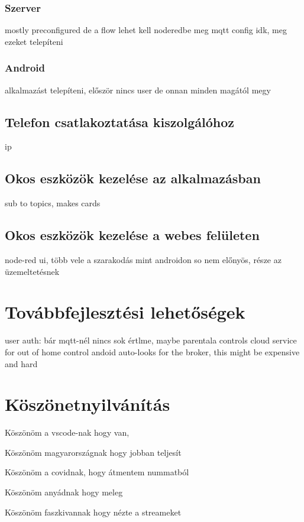 \documentclass[
]{thesis-ekf}
\theoremstyle{definition}
\theoremstyle{remark}
\begin{document}
\subsection{Szerver}
mostly preconfigured de a flow lehet kell noderedbe meg mqtt config idk, meg ezeket telepíteni
\subsection{Android}
alkalmazást telepíteni, először nincs user de onnan minden magától megy
\section{Telefon csatlakoztatása kiszolgálóhoz}
ip
\section{Okos eszközök kezelése az alkalmazásban}
sub to topics, makes cards
\section{Okos eszközök kezelése a webes felületen}
node-red ui, több vele a szarakodás mint androidon so nem előnyös, része az üzemeltetésnek


\chapter{Továbbfejlesztési lehetőségek}
user auth: bár mqtt-nél nincs sok értlme, maybe parentala controls
cloud service for out of home control
andoid auto-looks for the broker, this might be expensive and hard


\chapter*{Köszönetnyilvánítás}
\par
Köszönöm a vscode-nak hogy van,
\par
Köszönöm magyarországnak hogy jobban teljesít
\par
Köszönöm a covidnak, hogy átmentem nummatból
\par
Köszönöm anyádnak hogy meleg
\par
Köszönöm faszkivannak hogy nézte a streameket
\end{document}
